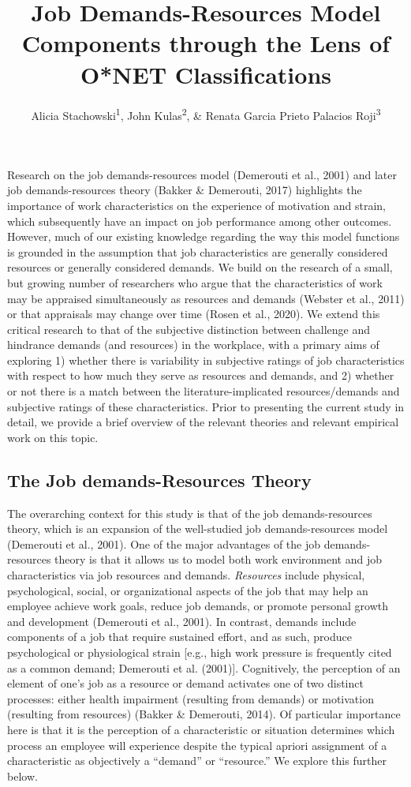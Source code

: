 \documentclass[
  english,
  man]{apa6}
\title{Job Demands-Resources Model Components through the Lens of O*NET Classifications}
\author{Alicia Stachowski\textsuperscript{1}, John Kulas\textsuperscript{2}, \& Renata Garcia Prieto Palacios Roji\textsuperscript{3}}
\date{}
\affiliation{\vspace{0.5cm}\textsuperscript{1} University of Wisconsin - Stout\\\textsuperscript{2} eRg\\\textsuperscript{3} PepsiCo}
\begin{document}
\maketitle

Research on the job demands-resources model (Demerouti et al., 2001) and later job demands-resources theory (Bakker \& Demerouti, 2017) highlights the importance of work characteristics on the experience of motivation and strain, which subsequently have an impact on job performance among other outcomes. However, much of our existing knowledge regarding the way this model functions is grounded in the assumption that job characteristics are generally considered resources or generally considered demands. We build on the research of a small, but growing number of researchers who argue that the characteristics of work may be appraised simultaneously as resources and demands (Webster et al., 2011) or that appraisals may change over time (Rosen et al., 2020). We extend this critical research to that of the subjective distinction between challenge and hindrance demands (and resources) in the workplace, with a primary aims of exploring 1) whether there is variability in subjective ratings of job characteristics with respect to how much they serve as resources and demands, and 2) whether or not there is a match between the literature-implicated resources/demands and subjective ratings of these characteristics. Prior to presenting the current study in detail, we provide a brief overview of the relevant theories and relevant empirical work on this topic.

\hypertarget{the-job-demands-resources-theory}{%
\subsection{The Job demands-Resources Theory}\label{the-job-demands-resources-theory}}

The overarching context for this study is that of the job demands-resources theory, which is an expansion of the well-studied job demands-resources model (Demerouti et al., 2001). One of the major advantages of the job demands-resources theory is that it allows us to model both work environment and job characteristics via job resources and demands. \emph{Resources} include physical, psychological, social, or organizational aspects of the job that may help an employee achieve work goals, reduce job demands, or promote personal growth and development (Demerouti et al., 2001). In contrast, demands include components of a job that require sustained effort, and as such, produce psychological or physiological strain {[}e.g., high work pressure is frequently cited as a common demand; Demerouti et al. (2001){]}. Cognitively, the perception of an element of one's job as a resource or demand activates one of two distinct processes: either health impairment (resulting from demands) or motivation (resulting from resources) (Bakker \& Demerouti, 2014). Of particular importance here is that it is the perception of a characteristic or situation determines which process an employee will experience despite the typical apriori assignment of a characteristic as objectively a ``demand'' or ``resource.'' We explore this further below.
\end{document}
